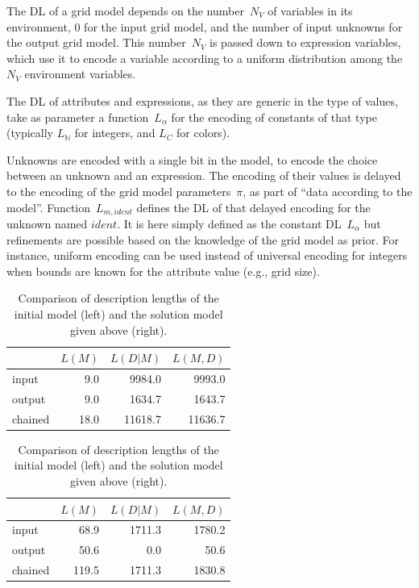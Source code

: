 \documentclass[a4paper]{llncs}
\newcommand{\nat}{\mathbb{N}}
\begin{document}
{The DL of a grid model depends on the number~$N_V$ of variables in its
environment, 0 for the input grid model, and the number of input
unknowns for the output grid model. This number~$N_V$ is passed down
to expression variables, which use it to encode a variable according to a
uniform distribution among the $N_V$ environment variables.

The DL of attributes and expressions, as they are generic in the type
of values, take as parameter a function~$L_\alpha$ for the encoding of
constants of that type (typically $L_\nat$ for integers, and $L_C$ for
colors).

Unknowns are encoded with a single bit in the model, to encode the
choice between an unknown and an expression. The encoding of their
values is delayed to the encoding of the grid model parameters~$\pi$,
as part of ``data according to the model''.  Function~$L_{m,ident}$
defines the DL of that delayed encoding for the unknown named
$ident$. It is here simply defined as the constant DL~$L_\alpha$ but
refinements are possible based on the knowledge of the grid model as
prior. For instance, uniform encoding can be used instead of universal
encoding for integers when bounds are known for the attribute value
(e.g., grid size).
}%

\begin{table}[t]
  \centering
  \caption{Comparison of description lengths of the initial model (left) and the solution model given above (right).}
  \begin{minipage}{0.4\textwidth}
    \begin{center}
      \begin{tabular}{|l||r|r||r|}
    \hline
          & $L(M)$ & $L(D|M)$ & $L(M,D)$ \\
    \hline
    \hline
    input & 9.0 & 9984.0 & 9993.0 \\
    \hline
    output & 9.0 & 1634.7 & 1643.7 \\
    \hline
    \hline
    chained & 18.0 & 11618.7 & 11636.7 \\
    \hline
      \end{tabular}
    \end{center}
  \end{minipage}
\hfill
\begin{minipage}{0.4\textwidth}
  \begin{center}
    \begin{tabular}{|l||r|r||r|}
    \hline
      & $L(M)$ & $L(D|M)$ & $L(M,D)$ \\
    \hline
    \hline
    input & 68.9 & 1711.3 & 1780.2 \\
    \hline
    output & 50.6 & 0.0 & 50.6 \\
    \hline
    \hline
    chained & 119.5 & 1711.3 & 1830.8 \\
    \hline
    \end{tabular}
  \end{center}
\end{minipage}
\label{tab:dl:example}
\end{table}
\end{document}
